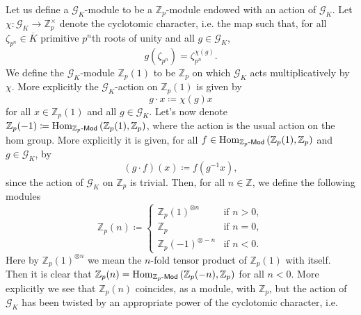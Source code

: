\begin{ntt}
	Let us define a \(\mathscr{G}_K\)-module to be a 
	$\mathbb{Z}_{p}$-module endowed with an action of $\mathscr{G}_K$.
	Let $\chi\colon \mathscr{G}_K \to \mathbb{Z}_{p}^{\times}$ denote the cyclotomic character,
	i.e. the map such that, for all $\zeta_{p^n} \in \overline{K}$ primitive 
	$p^n$th roots of unity and all \(g \in \mathscr{G}_K\),
	\begin{equation*}
		g(\zeta_{p^n}) = \zeta_{p^n}^{\chi(g)}
	.\end{equation*}
	We define the $\mathscr{G}_K$-module $\mathbb{Z}_{p}(1)$ to be $\mathbb{Z}_{p}$
	on which $\mathscr{G}_K$ acts multiplicatively by $\chi$.
	More explicitly the $\mathscr{G}_K$-action on $\mathbb{Z}_{p}(1)$ is given by
	\begin{equation*}
		g \cdot x \coloneqq \chi(g) x
	\end{equation*}
	for all $x \in \mathbb{Z}_{p}(1)$ and all $g \in \mathscr{G}_K$.
	Let's now denote $\mathbb{Z}_{p}(-1) \coloneqq \operatorname{Hom}_{ \mathbb{Z}_{p}\text{-}\mathsf{Mod} }
	\left( \mathbb{Z}_{p}(1), \mathbb{Z}_{p} \right)$, where the action is the usual action on the
	hom group.
	More explicitly it is given, for all $f \in \operatorname{Hom}_{ \mathbb{Z}_{p}\text{-}\mathsf{Mod} }
	\left( \mathbb{Z}_{p}(1), \mathbb{Z}_{p} \right)$ and $g \in \mathscr{G}_K$, by
	\begin{equation*}
		(g \cdot f)(x) \coloneqq f (g^{-1} x)
	,\end{equation*}
	since the action of $\mathscr{G}_K$ on $\mathbb{Z}_{p}$ is trivial.
	Then, for all $n \in \mathbb{Z}$, we define the following modules
	\begin{equation*}
		\mathbb{Z}_{p}(n) \coloneqq
		\begin{cases}
			\mathbb{Z}_{p}(1)^{\otimes n} & \text{if } n > 0,\\
			\mathbb{Z}_{p} & \text{if } n = 0,\\
			\mathbb{Z}_{p}(-1)^{\otimes -n} & \text{if } n < 0.
		\end{cases} 
	\end{equation*}
	Here by $\mathbb{Z}_{p}(1)^{\otimes n}$ we mean the $n$-fold tensor product
	of $\mathbb{Z}_{p}(1)$ with itself.
	Then it is clear that $\mathbb{Z}_{p}(n) = \operatorname{Hom}_{ \mathbb{Z}_{p}\text{-}\mathsf{Mod} }
	\left( \mathbb{Z}_{p}(-n), \mathbb{Z}_{p} \right)$ for all $n < 0$.
	More explicitly we see that $\mathbb{Z}_{p}(n)$ coincides, as a module,
	with $\mathbb{Z}_{p}$, but the action of $\mathscr{G}_K$ has been twisted by
	an appropriate power of the cyclotomic character, i.e$.$

\end{ntt}
